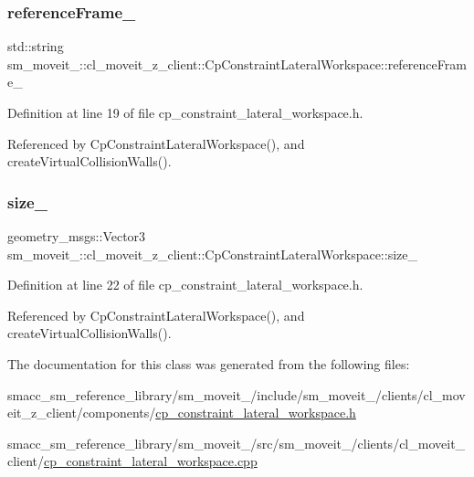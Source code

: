 \subsubsection{\texorpdfstring{reference\+Frame\+\_\+}{referenceFrame\_}}
{\footnotesize\ttfamily std\+::string sm\+\_\+moveit\+\_\+::cl\+\_\+moveit\+\_\+z\+\_\+client\+::\+Cp\+Constraint\+Lateral\+Workspace\+::reference\+Frame\+\_\+\hspace{0.3cm}{\ttfamily [private]}}



Definition at line 19 of file cp\+\_\+constraint\+\_\+lateral\+\_\+workspace.\+h.



Referenced by Cp\+Constraint\+Lateral\+Workspace(), and create\+Virtual\+Collision\+Walls().

\mbox{\label{classsm__moveit__4_1_1cl__moveit__z__client_1_1CpConstraintLateralWorkspace_a35fb6ec0933eff1c2e4a7930b9815fcb}} 
\subsubsection{\texorpdfstring{size\+\_\+}{size\_}}
{\footnotesize\ttfamily geometry\+\_\+msgs\+::\+Vector3 sm\+\_\+moveit\+\_\+::cl\+\_\+moveit\+\_\+z\+\_\+client\+::\+Cp\+Constraint\+Lateral\+Workspace\+::size\+\_\+\hspace{0.3cm}{\ttfamily [private]}}



Definition at line 22 of file cp\+\_\+constraint\+\_\+lateral\+\_\+workspace.\+h.



Referenced by Cp\+Constraint\+Lateral\+Workspace(), and create\+Virtual\+Collision\+Walls().



The documentation for this class was generated from the following files\+:\begin{DoxyCompactItemize}
\item 
smacc\+\_\+sm\+\_\+reference\+\_\+library/sm\+\_\+moveit\+\_/include/sm\+\_\+moveit\+\_/clients/cl\+\_\+moveit\+\_\+z\+\_\+client/components/\hyperlink{cp__constraint__lateral__workspace_8h}{cp\+\_\+constraint\+\_\+lateral\+\_\+workspace.\+h}\item 
smacc\+\_\+sm\+\_\+reference\+\_\+library/sm\+\_\+moveit\+\_/src/sm\+\_\+moveit\+\_/clients/cl\+\_\+moveit\+\_\+client/\hyperlink{cp__constraint__lateral__workspace_8cpp}{cp\+\_\+constraint\+\_\+lateral\+\_\+workspace.\+cpp}\end{DoxyCompactItemize}
